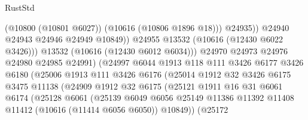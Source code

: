 \begin{lexlean}{RustStd}
\begin{coremodule}
                                          (@10800 (@10801 @6027))
                                          (@10616 (@10806 @1896 @18)))
                                        @24935))
                                    @24940
                                    @24943
                                    @24946
                                    @24949
                                    @10849))
                                @24955
                                @13532
                                (@10616 (@12430 @6022 @3426)))
                              @13532
                              (@10616 (@12430 @6012 @6034)))
                            @24970
                            @24973
                            @24976
                            @24980
                            @24985
                            @24991)
                          (@24997
                            @6044
                            @1913
                            @118
                            @111
                            @3426
                            @6177
                            @3426
                            @6180
                            (@25006
                              @1913
                              @111
                              @3426
                              @6176
                              (@25014
                                @1912
                                @32
                                @3426
                                @6175
                                @3475
                                @11138
                                (@24909
                                  @1912
                                  @32
                                  @6175
                                  (@25121
                                    @1911
                                    @16
                                    @31
                                    @6061
                                    @6174
                                    (@25128
                                      @6061
                                      (@25139
                                        @6049
                                        @6056
                                        @25149
                                        @11386
                                        @11392
                                        @11408
                                        @11412
                                        (@10616 (@11414 @6056 @6050))
                                        @10849))
                                    (@25172

\end{coremodule}
\end{lexlean}
